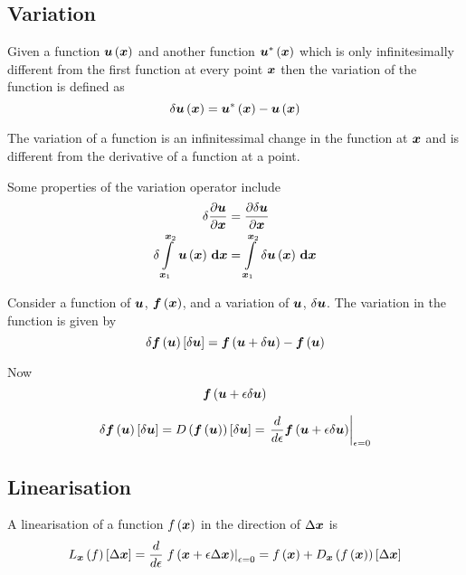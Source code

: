 \subsection{Variation}
\label{subsec:VariationOperator}

Given a function $ \boldsymbol{u}\left( \boldsymbol{x} \right) $  and another function
$ \boldsymbol{u}^{*}\left( \boldsymbol{x} \right) $ which is only infinitesimally different from
the first function at every point $\boldsymbol{x}$ then the variation of the
function is defined as
\begin{equation}
     \delta  \boldsymbol{u} \left( \boldsymbol{x} \right) = \boldsymbol{u}^{*}\left( \boldsymbol{x} \right) - \boldsymbol{u}\left( \boldsymbol{x} \right) 
\end{equation}

The variation of a function is an infinitessimal change in the function at
$\boldsymbol{x}$ and is different from the derivative of a function at a point.

Some properties of the variation operator include
\begin{equation}
  \begin{split}
      \delta   \dfrac{\partial \boldsymbol{u}}{\partial \boldsymbol{x}}  &= \dfrac{\partial   \delta  \boldsymbol{u} }{\partial \boldsymbol{x}}  \\
      \delta    \displaystyle\int\limits_{\boldsymbol{x}_{1}}^{\boldsymbol{x}_{2}} \, \boldsymbol{u}\left( \boldsymbol{x} \right) \, \boldsymbol{\mathrm{d}} \boldsymbol{x}  &=  \displaystyle\int\limits_{\boldsymbol{x}_{1}}^{\boldsymbol{x}_{2}} \,  \delta   \boldsymbol{u}\left( \boldsymbol{x} \right)  \, \boldsymbol{\mathrm{d}} \boldsymbol{x}  
  \end{split}
\end{equation}

Consider a function of $\boldsymbol{u}$, $ \boldsymbol{f}\left( \boldsymbol{x} \right) $, and a
variation of $\boldsymbol{u}$, $  \delta  \boldsymbol{u} $. The variation in the
function is given by
\begin{equation}
     \delta   \boldsymbol{f}\left( \boldsymbol{u} \right) \left[   \delta  \boldsymbol{u}  \right]  = \boldsymbol{f}\left( \boldsymbol{u}+  \delta  \boldsymbol{u}  \right) - \boldsymbol{f}\left( \boldsymbol{u} \right) 
\end{equation}

Now
\begin{equation}
   \boldsymbol{f}\left( \boldsymbol{u}+\epsilon  \delta  \boldsymbol{u}  \right) 
\end{equation}

\begin{equation}
  \variation{\fnof{\vectr{f}}{\vectr{u}}}{\vectr{u}}=\directionalderiv{}{\fnof{\vectr{f}}{\vectr{u}}}{\variationdir{\vectr{u}}}=\evalat{\dby{}{\epsilon}\fnof{\vectr{f}}{\vectr{u}+\epsilon\variationdir{\vectr{u}}}}{\epsilon=0}
\end{equation}
  
\subsection{Linearisation}
\label{subsec:Linearisation}

A linearisation of a function $ f\left( \boldsymbol{x} \right) $ in the direction of
$\Delta\boldsymbol{x}$ is
\begin{equation}
  \linearisation{f}{\vectr{x}}{\vectr{x}}=\dby{}{\epsilon}\evalat{\fnof{f}{\vectr{x}+\epsilon\linearisationdir{\vectr{x}}}}{\epsilon=0}=\fnof{f}{\vectr{x}}+\directionalderiv{\vectr{x}}{\fnof{f}{\vectr{x}}}{\linearisationdir{\vectr{x}}}
\end{equation}
